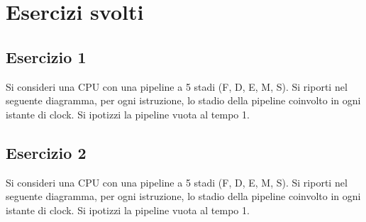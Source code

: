 \documentclass[a4paper]{article}
\theoremstyle{break}
\theoremstyle{break}
\theoremstyle{break}
\theoremstyle{break}
\begin{document}


\tableofcontents
\pagebreak

\section{Esercizi svolti}
\subsection{Esercizio 1}
Si consideri una CPU con una pipeline a 5 stadi (F, D, E, M, S). Si riporti nel seguente 
diagramma, per ogni istruzione, lo stadio della pipeline coinvolto in ogni istante di 
clock. Si ipotizzi la pipeline vuota al tempo 1.

\begin{table}[H]
  \centering
\end{table}

\subsection{Esercizio 2}
Si consideri una CPU con una pipeline a 5 stadi (F, D, E, M, S). Si riporti nel seguente diagramma,
per ogni istruzione, lo stadio della pipeline coinvolto in ogni istante di clock. Si ipotizzi la pipeline
vuota al tempo 1.

\begin{table}[H]
  \centering
\end{table}
\end{document}
